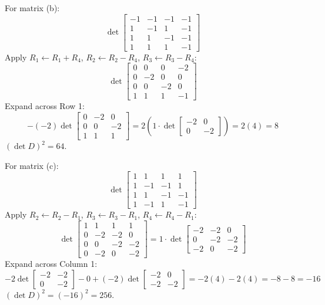\documentclass{article}
\begin{document}
For matrix (b):
\[ \det \begin{bmatrix} -1 & -1 & -1 & -1 \\ 1 & -1 & 1 & -1 \\ 1 & 1 & -1 & -1 \\ 1 & 1 & 1 & -1 \end{bmatrix} \]
Apply $R_1 \leftarrow R_1 + R_4$, $R_2 \leftarrow R_2 - R_4$, $R_3 \leftarrow R_3 - R_4$:
\[ \det \begin{bmatrix} 0 & 0 & 0 & -2 \\ 0 & -2 & 0 & 0 \\ 0 & 0 & -2 & 0 \\ 1 & 1 & 1 & -1 \end{bmatrix} \]
Expand across Row 1:
\[ -(-2) \det \begin{bmatrix} 0 & -2 & 0 \\ 0 & 0 & -2 \\ 1 & 1 & 1 \end{bmatrix} = 2 \left( 1 \cdot \det \begin{bmatrix} -2 & 0 \\ 0 & -2 \end{bmatrix} \right) = 2(4) = 8 \]
$(\det D)^2 = 64$.

For matrix (c):
\[ \det \begin{bmatrix} 1 & 1 & 1 & 1 \\ 1 & -1 & -1 & 1 \\ 1 & 1 & -1 & -1 \\ 1 & -1 & 1 & -1 \end{bmatrix} \]
Apply $R_2 \leftarrow R_2 - R_1$, $R_3 \leftarrow R_3 - R_1$, $R_4 \leftarrow R_4 - R_1$:
\[ \det \begin{bmatrix} 1 & 1 & 1 & 1 \\ 0 & -2 & -2 & 0 \\ 0 & 0 & -2 & -2 \\ 0 & -2 & 0 & -2 \end{bmatrix} = 1 \cdot \det \begin{bmatrix} -2 & -2 & 0 \\ 0 & -2 & -2 \\ -2 & 0 & -2 \end{bmatrix} \]
Expand across Column 1:
\[ -2 \det \begin{bmatrix} -2 & -2 \\ 0 & -2 \end{bmatrix} - 0 + (-2) \det \begin{bmatrix} -2 & 0 \\ -2 & -2 \end{bmatrix} = -2(4) - 2(4) = -8 - 8 = -16 \]
$(\det D)^2 = (-16)^2 = 256$.
\end{document}
